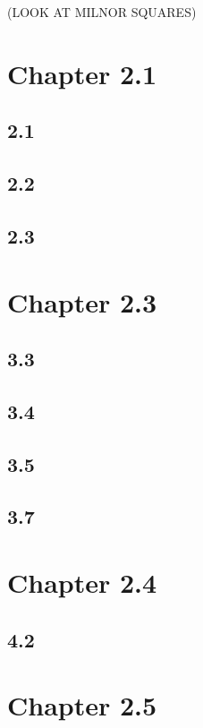 \documentclass[12pt]{extarticle}
\begin{document}
(LOOK AT MILNOR SQUARES)

\section{Chapter 2.1}

\subsection{2.1}

\subsection{2.2}

\subsection{2.3}

\section{Chapter 2.3}

\subsection{3.3}

\subsection{3.4}

\subsection{3.5}

\subsection{3.7}

\section{Chapter 2.4}

\subsection{4.2}

\section{Chapter 2.5}
\end{document}
